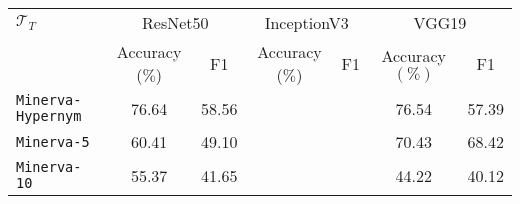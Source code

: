 \begin{tabular}{l|cc|cc|cc} \hline
	$\mathcal{T}_T$ &  \multicolumn{2}{c}{ResNet50} & \multicolumn{2}{|c|}{InceptionV3} & \multicolumn{2}{c}{VGG19}\\
			& Accuracy ($\%$) & F1 & Accuracy ($\%$) & F1 & Accuracy $(\%)$ & F1 \\\hline \hline
	\texttt{Minerva-Hypernym} & 76.64 & 58.56 & \cellcolor{green!25}{79.40} & \cellcolor{green!25}{60.07} & 76.54 & 57.39 \\
	\texttt{Minerva-5} & 60.41  & 49.10 & \cellcolor{green!25}{72.06} & \cellcolor{green!25}{68.89} & 70.43 & 68.42\\
	\texttt{Minerva-10} & 55.37 & 41.65  & \cellcolor{green!25}{60.1} & \cellcolor{green!25}{45.12} & 44.22 & 40.12 \\
\hline
\end{tabular}
